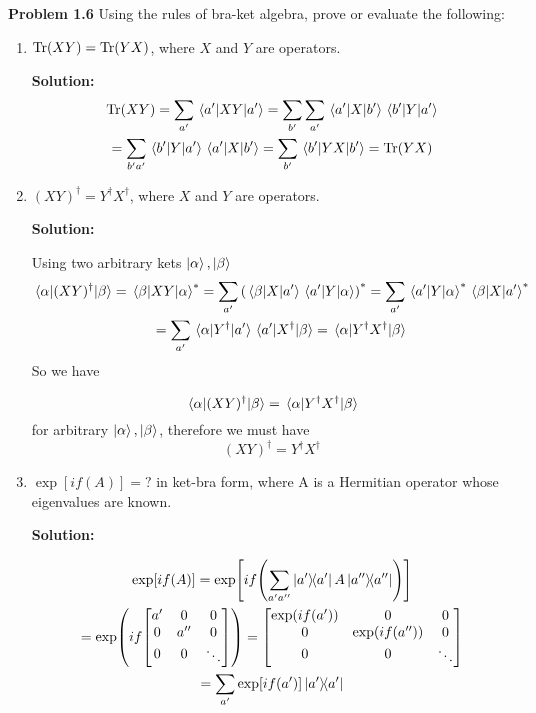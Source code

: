 \item \textbf{Problem 1.6}  Using the rules of bra-ket algebra, prove or evaluate the following: 
\begin{enumerate}
    \item $\Tr(XY) = \Tr(YX)$, where $X$ and $Y$ are operators.
    
    \textbf{Solution:}
    \begin{gather*}
    \Tr(XY) = \sum_{a'} \ev{XY}{a'} = \sum_{b'}\sum_{a'} \mel{a'}{X}{b'} \mel{b'}{Y}{a'} \\
    = \sum_{b'a'} \mel{b'}{Y}{a'} \mel{a'}{X}{b'} = \sum_{b'} \mel{b'}{YX}{b'} = \Tr(YX)
    \end{gather*}
        
    \item $(XY)^\dag = Y^\dagger X^\dag$, where $X$ and $Y$ are operators.
    
    \textbf{Solution:}

    Using two arbitrary kets $\ket \alpha, \ket \beta$
    \begin{gather*}
        \mel{\alpha}{(XY)^\dag}{\beta} = \mel{\beta}{XY}{\alpha}^* = \sum_{a'} \qty(\mel{\beta}{X}{a'}\mel{a'}{Y}{\alpha})^* = \sum_{a'} \mel{a'}{Y}{\alpha}^* \mel{\beta}{X}{a'}^* \\
        = \sum_{a'}\mel{\alpha}{Y^\dag}{a'}\mel{a'}{X^\dag}{\beta} = \mel{\alpha}{Y^\dag X^\dag}{\beta}
    \end{gather*}
    So we have 

    \[
    \mel{\alpha}{(XY)^\dag}{\beta}=\mel{\alpha}{Y^\dag X^\dag}{\beta}
    \]
    for arbitrary $\ket \alpha, \ket \beta$, therefore we must have 
    \[
    (XY)^\dag = Y^\dagger X^\dag
    \]
    
    
    
    \item $\exp[if(A)] =?$ in ket-bra form, where A is a Hermitian operator whose eigenvalues are known.
    
    \textbf{Solution:}
    
    \begin{gather*}
        \exp[if(A)] = \exp[if\qty(\sum_{a'a''} \op{a'} A \op{a''})] \\
        = \exp(if \mqty[\dmat[0]{a',a'' , \ddots}]) = \mqty[\dmat[0]{\exp(if(a')),\exp(if(a'')), \ddots}]\\
        = \sum_{a'}\exp[if(a')]\op{a'}
    \end{gather*}
    
    
    
\end{enumerate}